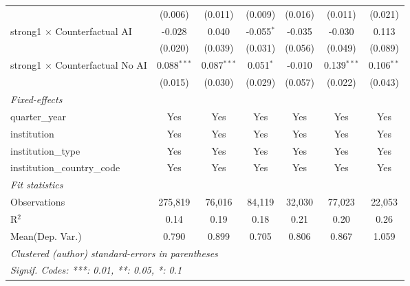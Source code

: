 \begin{tabular}{lcccccc}
                                          & (0.006)       & (0.011)       & (0.009)       & (0.016)       & (0.011)        & (0.021)\\   
   strong1 $\times$ Counterfactual AI     & -0.028        & 0.040         & -0.055$^{*}$  & -0.035        & -0.030         & 0.113\\   
                                          & (0.020)       & (0.039)       & (0.031)       & (0.056)       & (0.049)        & (0.089)\\   
   strong1 $\times$ Counterfactual No AI  & 0.088$^{***}$ & 0.087$^{***}$ & 0.051$^{*}$   & -0.010        & 0.139$^{***}$  & 0.106$^{**}$\\   
                                          & (0.015)       & (0.030)       & (0.029)       & (0.057)       & (0.022)        & (0.043)\\   
   \midrule
   \emph{Fixed-effects}\\
   quarter\_year                          & Yes           & Yes           & Yes           & Yes           & Yes            & Yes\\  
   institution                            & Yes           & Yes           & Yes           & Yes           & Yes            & Yes\\  
   institution\_type                      & Yes           & Yes           & Yes           & Yes           & Yes            & Yes\\  
   institution\_country\_code             & Yes           & Yes           & Yes           & Yes           & Yes            & Yes\\  
   \midrule
   \emph{Fit statistics}\\
   Observations                           & 275,819       & 76,016        & 84,119        & 32,030        & 77,023         & 22,053\\  
   R$^2$                                  & 0.14          & 0.19          & 0.18          & 0.21          & 0.20           & 0.26\\  
Mean(Dep. Var.) & 0.790 & 0.899 & 0.705 & 0.806 & 0.867 & 1.059 \\
   \midrule \midrule
   \multicolumn{7}{l}{\emph{Clustered (author) standard-errors in parentheses}}\\
   \multicolumn{7}{l}{\emph{Signif. Codes: ***: 0.01, **: 0.05, *: 0.1}}\\
\end{tabular}
\par\endgroup
